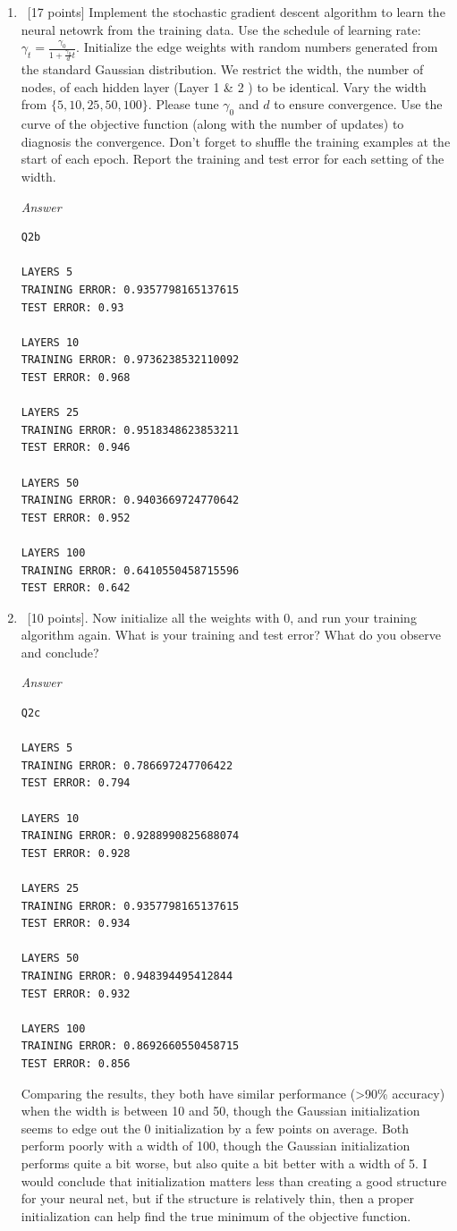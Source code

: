 \documentclass[12pt, fullpage,letterpaper]{article}
\begin{document}
\begin{enumerate}
\begin{enumerate}
	\item~[17 points] Implement the stochastic gradient descent algorithm to learn the neural netowrk from the training data.  	Use the schedule of learning rate: $\gamma_t = \frac{\gamma_0}{1+\frac{\gamma_0}{d}t}	$.  Initialize the edge weights with random numbers generated from the standard Gaussian distribution. We restrict the width, \ie the number of nodes, of each hidden layer (\ie Layer 1 \& 2 ) to be identical.  Vary the width from $\{5, 10, 25, 50, 100\}$. Please tune $\gamma_0$ and $d$ to ensure convergence. Use the curve of the objective function (along with the number of updates) to diagnosis the convergence.  Don't forget to shuffle the training examples at the start of each epoch. Report the training and test error for each setting of the width.
	
	\emph{Answer}
	
	\begin{verbatim}
Q2b

LAYERS 5
TRAINING ERROR: 0.9357798165137615
TEST ERROR: 0.93

LAYERS 10
TRAINING ERROR: 0.9736238532110092
TEST ERROR: 0.968

LAYERS 25
TRAINING ERROR: 0.9518348623853211
TEST ERROR: 0.946

LAYERS 50
TRAINING ERROR: 0.9403669724770642
TEST ERROR: 0.952

LAYERS 100
TRAINING ERROR: 0.6410550458715596
TEST ERROR: 0.642
	\end{verbatim}
	
	
	\item~[10 points]. Now initialize all the weights with $0$, and run your training algorithm again. What is your training and test error? What do you observe and  conclude?
	
	\emph{Answer}
	
	\begin{verbatim}
Q2c

LAYERS 5
TRAINING ERROR: 0.786697247706422
TEST ERROR: 0.794

LAYERS 10
TRAINING ERROR: 0.9288990825688074
TEST ERROR: 0.928

LAYERS 25
TRAINING ERROR: 0.9357798165137615
TEST ERROR: 0.934

LAYERS 50
TRAINING ERROR: 0.948394495412844
TEST ERROR: 0.932

LAYERS 100
TRAINING ERROR: 0.8692660550458715
TEST ERROR: 0.856
	\end{verbatim}
	
	Comparing the results, they both have similar performance (>90\% accuracy) when the width is between 10 and 50, though the Gaussian initialization seems to edge out the 0 initialization by a few points on average. Both perform poorly with a width of 100, though the Gaussian initialization performs quite a bit worse, but also quite a bit better with a width of 5. I would conclude that initialization matters less than creating a good structure for your neural net, but if the structure is relatively thin, then a proper initialization can help find the true minimum of the objective function.
	

\end{enumerate}
\end{enumerate}
\end{document}
